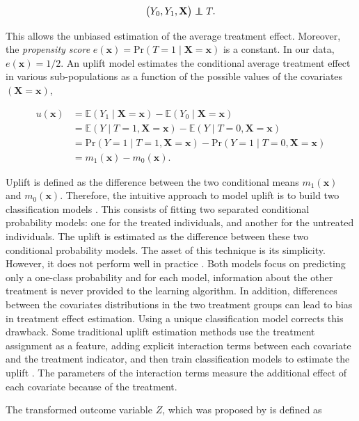 \documentclass{article}
\newcommand\independent{\protect\mathpalette{\protect\independenT}{\perp}}
\def\independenT#1#2{\mathrel{\rlap{$#1#2$}\mkern2mu{#1#2}}}
\def\X{\mathbf X}
\def\x{\mathbf x}
\begin{document}
\begin{equation}
    \big( Y_0, Y_1, \X \big) \independent T. 
    \label{eq:randomization}
\end{equation}

This allows the unbiased estimation of the average treatment effect. Moreover, the \textit{propensity score} $e(\x)= \mathrm{Pr}(T=1 \mid \X=\x)$ is a constant. In our data, $e(\x) = 1/2$. An uplift model estimates the conditional average treatment effect in various sub-populations as a function of the possible values of the covariates $(\X=\x)$,

\begin{align}
    u(\x) &= \mathbb{E} ( Y_1 \mid \X=\x) - \mathbb{E} ( Y_0 \mid \X=\x) \nonumber\\
     &= \mathbb{E} ( Y \mid T=1, \X=\x) - \mathbb{E} ( Y \mid T=0, \X=\x) \nonumber \\
     &= \mathrm{Pr} ( Y = 1 \mid T=1, \X=\x) - \mathrm{Pr} ( Y = 1 \mid T=0, \X=\x) \nonumber \\
      &=m_1(\x) - m_0(\x). 
    \label{eq:uplift}
\end{align}


Uplift is defined as the difference between the two conditional means $m_1(\x)$ and $m_0(\x)$. Therefore, the intuitive approach to model uplift is to build two classification models \citep{hansotia2002direct}. This consists of fitting two separated conditional probability models: one for the treated individuals, and another for the untreated individuals. The uplift is estimated as the difference between these two conditional probability models. The asset of this technique is its simplicity. However, it does not perform well in practice \citep{radcliffe2011real}. Both models focus on predicting only a one-class probability and for each model, information about the other treatment is never provided to the learning algorithm. In addition, differences between the covariates distributions in the two treatment groups can lead to bias in treatment effect estimation. Using a unique classification model corrects this drawback. Some traditional uplift estimation methods use the treatment assignment as a feature, adding explicit interaction terms between each covariate and the treatment indicator, and then train classification models to estimate the uplift \citep{lo2002true}. The parameters of the interaction terms measure the additional effect of each covariate because of the treatment.

The transformed outcome variable $Z$, which was proposed by \citep{athey2015machine} is defined as  
\end{document}
